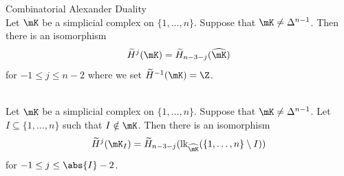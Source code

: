 \documentclass[a4paper]{article}
\begin{document}
\begin{thm}{Combinatorial Alexander Duality}{}\\
Let $\mK$ be a simplicial complex on $\{1,\dots,n\}$. Suppose that $\mK\neq\Delta^{n-1}$. Then there is an isomorphism $$\widetilde{H}^j(\mK)=\widetilde{H}_{n-3-j}(\widehat{\mK})$$ for $-1\leq j\leq n-2$ where we set $\widetilde{H}^{-1}(\mK)=\Z$. 
\end{thm}

\begin{crl}{}{}\\
Let $\mK$ be a simplicial complex on $\{1,\dots,n\}$. Suppose that $\mK\neq\Delta^{n-1}$. Let $I\subseteq\{1,\dots,n\}$ such that $I\notin\mK$. Then there is an isomorphism $$\widetilde{H}^j(\mK_I)=\widetilde{H}_{n-3-j}(\text{lk}_{\widehat{\mK}}(\{1,\dots,n\}\setminus I))$$ for $-1\leq j\leq\abs{I}-2$. 
\end{crl}
\end{document}
